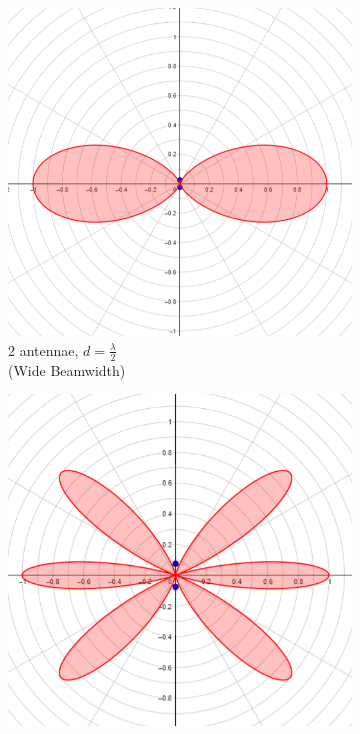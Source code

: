 \documentclass[a4paper,twoside,12pt,hidelinks]{article}
\begin{document}
\begin{figure}[H]
\centering
\captionsetup{justification=centering}
\begin{subfigure}[H]{0.3\textwidth}
\includegraphics[width=\textwidth]{beamforming}
\caption{2 antennae, $d =\frac{\lambda}{2}$ \\(Wide Beamwidth)}
\end{subfigure}
\begin{subfigure}[H]{0.3\textwidth}
\includegraphics[width=\textwidth]{beamformingalias}

\end{subfigure}
\end{figure}
\end{document}
